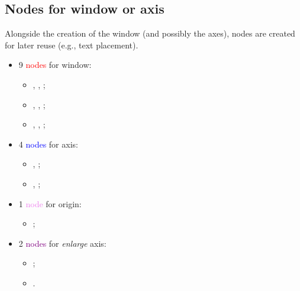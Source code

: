 \documentclass[11pt,a4paper]{ltxdoc}
\begin{document}
\pagebreak

\subsection{Nodes for window or axis}

Alongside the creation of the window (and possibly the axes), nodes are created for later reuse (e.g., text placement).

\begin{itemize}
	\item 9 \textcolor{red}{nodes} for window:
	\begin{itemize}
		\item {}, ,  ;
		\item {}, ,  ;
		\item {}, ,  ;
	\end{itemize}
	\item 4 \textcolor{blue}{nodes} for axis:
	\begin{itemize}
		\item {},  ;
		\item {},  ;
	\end{itemize}
	\item 1 \textcolor{violet}{node} for origin:
	\begin{itemize}
		\item {} ;
	\end{itemize}
	\item 2 \textcolor{purple}{nodes} for \textit{enlarge} axis:
	\begin{itemize}
		\item {} ;
		\item {}.
	\end{itemize}
\end{itemize}
\end{document}
